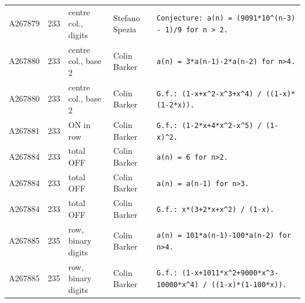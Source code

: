 \documentclass[11pt]{article}
\theoremstyle{definition}
\theoremstyle{remark}
\begin{document}
{\begin{longtable}{p{1.3cm}p{0.7cm}p{2.4cm}p{2.3cm}p{7.3cm}}
A267879 & 233 & centre col., digits & Stefano Spezia & \texttt{Conjecture: \allowbreak{}a(n)\allowbreak{} \allowbreak{}=\allowbreak{} \allowbreak{}(9091*\allowbreak{}10\^{}(n-\allowbreak{}3)\allowbreak{} \allowbreak{}-\allowbreak{} \allowbreak{}1)\allowbreak{}/\allowbreak{}9 \allowbreak{}for \allowbreak{}n \allowbreak{}> \allowbreak{}2.} \\
A267880 & 233 & centre col., base 2 & Colin Barker & \texttt{a(n)\allowbreak{} \allowbreak{}=\allowbreak{} \allowbreak{}3*\allowbreak{}a(n-\allowbreak{}1)\allowbreak{}-\allowbreak{}2*\allowbreak{}a(n-\allowbreak{}2)\allowbreak{} \allowbreak{}for \allowbreak{}n>4.} \\
A267880 & 233 & centre col., base 2 & Colin Barker & \texttt{G.f.: \allowbreak{}(1-\allowbreak{}x+\allowbreak{}x\^{}2-\allowbreak{}x\^{}3+\allowbreak{}x\^{}4)\allowbreak{} \allowbreak{}/\allowbreak{} \allowbreak{}((1-\allowbreak{}x)\allowbreak{}*\allowbreak{}(1-\allowbreak{}2*\allowbreak{}x)\allowbreak{})\allowbreak{}.} \\
A267881 & 233 & ON in row & Colin Barker & \texttt{G.f.: \allowbreak{}(1-\allowbreak{}2*\allowbreak{}x+\allowbreak{}4*\allowbreak{}x\^{}2-\allowbreak{}x\^{}5)\allowbreak{} \allowbreak{}/\allowbreak{} \allowbreak{}(1-\allowbreak{}x)\allowbreak{}\^{}2.} \\
A267884 & 233 & total OFF & Colin Barker & \texttt{a(n)\allowbreak{} \allowbreak{}=\allowbreak{} \allowbreak{}6 \allowbreak{}for \allowbreak{}n>2.} \\
A267884 & 233 & total OFF & Colin Barker & \texttt{a(n)\allowbreak{} \allowbreak{}=\allowbreak{} \allowbreak{}a(n-\allowbreak{}1)\allowbreak{} \allowbreak{}for \allowbreak{}n>3.} \\
A267884 & 233 & total OFF & Colin Barker & \texttt{G.f.: \allowbreak{}x*\allowbreak{}(3+\allowbreak{}2*\allowbreak{}x+\allowbreak{}x\^{}2)\allowbreak{} \allowbreak{}/\allowbreak{} \allowbreak{}(1-\allowbreak{}x)\allowbreak{}.} \\
A267885 & 235 & row, binary digits & Colin Barker & \texttt{a(n)\allowbreak{} \allowbreak{}=\allowbreak{} \allowbreak{}101*\allowbreak{}a(n-\allowbreak{}1)\allowbreak{}-\allowbreak{}100*\allowbreak{}a(n-\allowbreak{}2)\allowbreak{} \allowbreak{}for \allowbreak{}n>4.} \\
A267885 & 235 & row, binary digits & Colin Barker & \texttt{G.f.: \allowbreak{}(1-\allowbreak{}x+\allowbreak{}1011*\allowbreak{}x\^{}2+\allowbreak{}9000*\allowbreak{}x\^{}3-\allowbreak{}10000*\allowbreak{}x\^{}4)\allowbreak{} \allowbreak{}/\allowbreak{} \allowbreak{}((1-\allowbreak{}x)\allowbreak{}*\allowbreak{}(1-\allowbreak{}100*\allowbreak{}x)\allowbreak{})\allowbreak{}.} \\

\end{longtable}}
\end{document}
